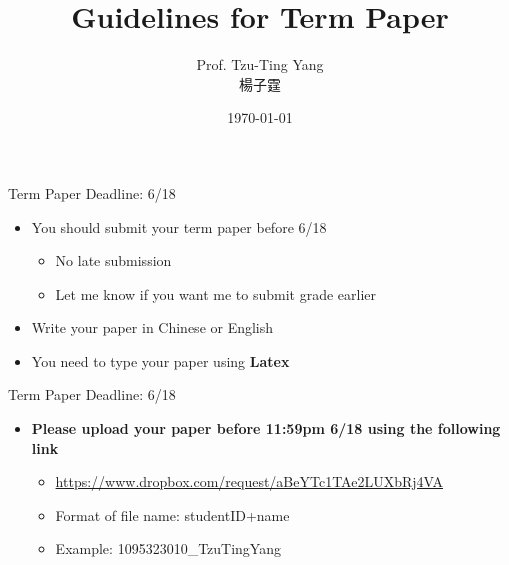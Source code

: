 \documentclass[dvipsnames,hyperref={pdfpagelabels=false}]{beamer}
\title[]  
{Guidelines for Term Paper}
\author 
{Prof. Tzu-Ting Yang  \\ 楊子霆}
\institute{Institute of Economics, Academia Sinica  \\ 中央研究院經濟研究所}
\date
{\today}
\begin{document}
\begin{frame}{}
 \titlepage
\end{frame}


\begin{frame}{Term Paper Deadline: 6/18}
\begin{itemize}
	
	\item You should submit your term paper before 6/18
	\vspace{0.2cm} 
	\begin{itemize}
		\item No late submission 
		\vspace{0.2cm}
		\item Let me know if you want me to submit grade earlier
	\end{itemize}
	\vspace{0.2cm}
	\item Write your paper in Chinese or English
   \vspace{0.2cm}
    \item You need to type your paper using \textbf{Latex}
	
\end{itemize}
\end{frame}



\begin{frame}{Term Paper Deadline: 6/18}
	\begin{itemize}
		
	  \item \textbf{Please upload your paper before 11:59pm 6/18 using the following link}
	\vspace{0.2cm}
	\begin{itemize}
		\item \url{https://www.dropbox.com/request/aBeYTc1TAe2LUXbRj4VA}
		\vspace{0.2cm}
		\item Format of file name: studentID+name
		\vspace{0.2cm}
		\item Example: 1095323010\_TzuTingYang
		\vspace{0.2cm}
	\end{itemize}
		
	\end{itemize}
\end{frame}
\end{document}
